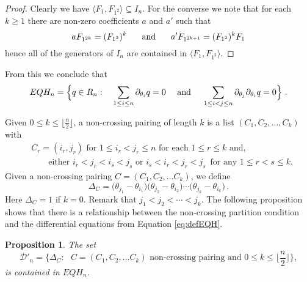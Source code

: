 \documentclass[11pt,oneside]{amsart}
\newtheorem{prop}[theorem]{Proposition}
\theoremstyle{definition}
\numberwithin{equation}{section}
\begin{document}
\begin{proof} Clearly we have $ \langle F_1, F_{1^2}  \rangle \subseteq I_n$.
For the converse we note that for each $k\geq 1$
there are non-zero coefficients $a$ and $a'$ such that
\[
a F_{1^{2k}} = (F_{1^2})^k \hskip .2in\hbox{   and   }\hskip .2in a' F_{1^{2k+1}} = (F_{1^2})^k F_1
\]
hence all of the generators of $I_n$ are contained in $\langle F_1, F_{1^2}  \rangle$.
\end{proof}
From this we conclude that
\begin{equation}\label{eq:defEQH}
EQH_n =  \Big\{ q \in R_n :  \quad\sum_{1\le i\le n} \partial_{\theta_i}q= 0 \quad\hbox{ and  }\quad \sum_{1\le i<j\le n} \partial_{\theta_j}\partial_{\theta_i}q= 0 \Big\}~.
\end{equation}

Given $0\le k\le \lfloor \frac{n}{2}\rfloor$, a non-crossing pairing of length $k$ is a
list $(C_1, C_2, \ldots, C_k)$ with
\begin{align*}
 &C_r=(i_r,j_r) \text{ for $1\le i_r<j_r\le n$ for each $1 \leq r \leq k$ and,}\\
 &\qquad \text{either } i_r<j_r<i_s<j_s  \text{ or }  i_s<i_r<j_r<j_s\,\text{ for any $1\le r<s\le k$}.
\end{align*}
Given a non-crossing pairing $C=(C_1,C_2,\ldots C_k)$, we define
\begin{equation}\label{eq:Deltadef}
\Delta_C = \big(\theta_{j_1}-\theta_{i_1}\big)\big(\theta_{j_2}-\theta_{i_2}\big)\cdots \big(\theta_{j_k}-\theta_{i_k}\big)\,.
\end{equation}
Here $\Delta_C=1$ if $k=0$. Remark that $j_1<j_2<\cdots< j_k$.
The following proposition shows that there is a relationship between the non-crossing
partition condition and the differential equations from Equation \eqref{eq:defEQH}.

\begin{prop}\label{prop:harmelem}
The set
$${\mathcal D}'_n =\big\{ \Delta_C: \text{ $C=(C_1,C_2,\ldots C_k)$  non-crossing pairing and $0\le k\le \lfloor \frac{n}{2}\rfloor$}\big\},
$$
is contained in $EQH_n $.
\end{prop}
\end{document}
